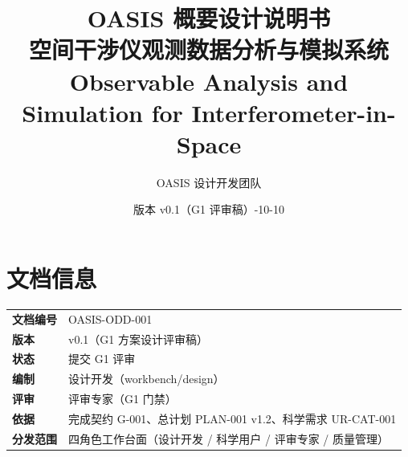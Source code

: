 \documentclass[UTF8,a4paper,11pt]{ctexart}
\title{\textbf{OASIS 概要设计说明书}\\[0.4em]
  \large 空间干涉仪观测数据分析与模拟系统\\
  \large Observable Analysis and Simulation for Interferometer-in-Space}
\author{OASIS 设计开发团队}
\date{版本 v0.1（G1 评审稿）\quad 2026-10-10}
\begin{document}
\maketitle

\section*{文档信息}
\begin{center}
\begin{tabular}{>{\bfseries}ll}
\toprule
文档编号 & OASIS-ODD-001 \\
版本 & v0.1（G1 方案设计评审稿） \\
状态 & 提交 G1 评审 \\
编制 & 设计开发（workbench/design） \\
评审 & 评审专家（G1 门禁） \\
依据 & 完成契约 G-001、总计划 PLAN-001 v1.2、科学需求 UR-CAT-001 \\
分发范围 & 四角色工作台面（设计开发 / 科学用户 / 评审专家 / 质量管理） \\
\bottomrule
\end{tabular}
\end{center}

\tableofcontents
\clearpage












\nocite{duvert2017oifits,fits_standard40,greisen2002wcs,astropy2022,quanz2022life,monnier2003optical,eisenhauer2023advances}


\end{document}
